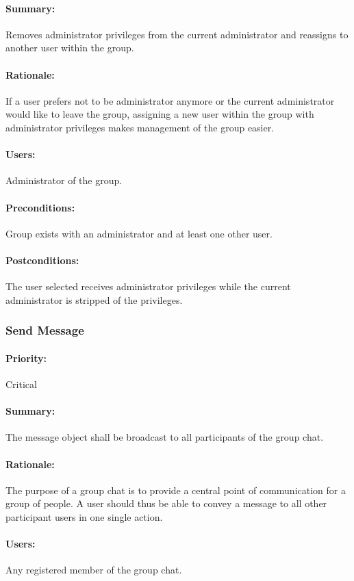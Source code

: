 \documentclass[11pt]{article}
\begin{document}
\paragraph{Summary:}
Removes administrator privileges from the current administrator and reassigns to another user within the group.
\paragraph{Rationale:}
If a user prefers not to be administrator anymore or the current administrator would like to leave the group, assigning a new user within the group with administrator privileges makes management of the group easier.
\paragraph{Users:}
Administrator of the group.
\paragraph{Preconditions:}
Group exists with an administrator and at least one other user.
\paragraph{{Postconditions:}}
The user selected receives administrator privileges while the current administrator is stripped of the privileges.

\subsubsection{Send Message} \label{UC-send-message}
\paragraph{Priority:} Critical
\paragraph{Summary:} The message object shall be broadcast to all participants of the group chat.
\paragraph{Rationale:} The purpose of a group chat is to provide a central point of communication for a group of people. A user should thus be able to convey a message to all other participant users in one single action.
\paragraph{Users:} Any registered member of the group chat.
\end{document}
